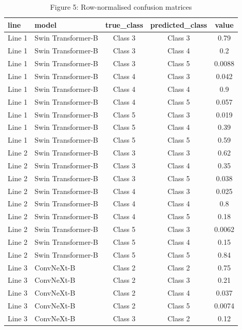 \begin{table}[ht]
\centering
\caption{Figure 5: Row-normalised confusion matrices}
\begin{tabular}{llccc}
\hline
line & model & true_class & predicted_class & value \\
\hline
Line 1 & Swin Transformer-B & Class 3 & Class 3 & 0.79 \\
Line 1 & Swin Transformer-B & Class 3 & Class 4 & 0.2 \\
Line 1 & Swin Transformer-B & Class 3 & Class 5 & 0.0088 \\
Line 1 & Swin Transformer-B & Class 4 & Class 3 & 0.042 \\
Line 1 & Swin Transformer-B & Class 4 & Class 4 & 0.9 \\
Line 1 & Swin Transformer-B & Class 4 & Class 5 & 0.057 \\
Line 1 & Swin Transformer-B & Class 5 & Class 3 & 0.019 \\
Line 1 & Swin Transformer-B & Class 5 & Class 4 & 0.39 \\
Line 1 & Swin Transformer-B & Class 5 & Class 5 & 0.59 \\
Line 2 & Swin Transformer-B & Class 3 & Class 3 & 0.62 \\
Line 2 & Swin Transformer-B & Class 3 & Class 4 & 0.35 \\
Line 2 & Swin Transformer-B & Class 3 & Class 5 & 0.038 \\
Line 2 & Swin Transformer-B & Class 4 & Class 3 & 0.025 \\
Line 2 & Swin Transformer-B & Class 4 & Class 4 & 0.8 \\
Line 2 & Swin Transformer-B & Class 4 & Class 5 & 0.18 \\
Line 2 & Swin Transformer-B & Class 5 & Class 3 & 0.0062 \\
Line 2 & Swin Transformer-B & Class 5 & Class 4 & 0.15 \\
Line 2 & Swin Transformer-B & Class 5 & Class 5 & 0.84 \\
Line 3 & ConvNeXt-B & Class 2 & Class 2 & 0.75 \\
Line 3 & ConvNeXt-B & Class 2 & Class 3 & 0.21 \\
Line 3 & ConvNeXt-B & Class 2 & Class 4 & 0.037 \\
Line 3 & ConvNeXt-B & Class 2 & Class 5 & 0.0074 \\
Line 3 & ConvNeXt-B & Class 3 & Class 2 & 0.12 \\

\end{tabular}
\end{table}
